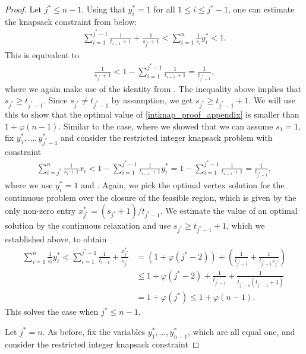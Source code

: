 \documentclass[pdflatex]{sn-jnl}
\theoremstyle{thmstyleone}%
\theoremstyle{thmstyletwo}%
\theoremstyle{thmstylethree}%
\begin{document}
\begin{proof}
		Let $j^* \leq n - 1$. 
		Using that $y_{i}^*= 1$ for all $1\leq i \leq j^*-1$, one can estimate the knapsack constraint from below:
		\begin{align*}
			\sum_{i=1}^{j^*-1}\frac{1}{t_{i-1} + 1} + \frac{1}{s_{j^*} + 1} < \sum_{i=1}^n \frac{1}{s_i}y^*_i < 1.
		\end{align*}
		This is equivalent to 
		\begin{align*}
			\frac{1}{s_{j^*} + 1} < 1 - \sum_{i=1}^{j^*-1} \frac{1}{t_{i-1} + 1} = \frac{1}{t_{j^*-1}},
		\end{align*}
		where we again make use of the identity from \cite{sylvestersequence1880sylvester}. The inequality above implies that $s_{j^*}\geq t_{j^*-1}$. Since $s_{j^*}\neq t_{j^*-1}$ by assumption, we get $s_{j^*}\geq t_{j^*-1} + 1$. We will use this to show that the optimal value of \eqref{intknap_proof_appendix} is smaller than $1+\varphi(n-1)$. Similar to the case, where we showed that we can assume $s_1 = 1$, fix $y_1^*,\ldots,y_{j^*-1}^*$ and consider the restricted integer knapsack problem with constraint
		\begin{align*}
			\sum_{i = j^*}^n \frac{1}{s_i + 1}x_i < 1 - \sum_{i=1}^{j^*-1} \frac{1}{t_{i-1} + 1}y^*_{i} =  1 - \sum_{i=1}^{j^*-1} \frac{1}{t_{i-1} + 1} = \frac{1}{t_{j^*-1}},
		\end{align*} 
		where we use $y^*_{i} = 1$ and \cite{sylvestersequence1880sylvester}. 
		Again, we pick the optimal vertex solution for the continuous problem over the closure of the feasible region, which is given by the only non-zero entry $x^*_{j^*} = (s_{j^*} + 1)/t_{j^*-1}$. We estimate the value of an optimal solution by the continuous relaxation and use $s_{j^*}\geq t_{j^*-1} + 1$, which we established above, to obtain
		\begin{align*}
			\sum_{i=1}^n \frac{1}{s_i}y^*_i < \sum_{i=1}^{j^*-1}\frac{1}{t_{i-1}} + \frac{x^*_{j^*}}{s_{j^*}} & = (1 + \varphi(j^* - 2)) + \left(\frac{1}{t_{j^*-1}} + \frac{1}{t_{j^*-1}s_{j^*}}\right) \\ 
			& \leq 1 + \varphi(j^* - 2) + \frac{1}{t_{j^*-1}} + \frac{1}{t_{j^*-1}(t_{j^*-1} + 1)} \\
			& = 1 + \varphi(j^*) \leq 1 + \varphi(n-1).
		\end{align*} 
		This solves the case when $j^* \leq n-1$.
		
		Let $j^* = n$. As before, fix the variables $y_1^*,\ldots,y_{n-1}^*$, which are all equal one, and consider the restricted integer knapsack constraint
		

\end{proof}
\end{document}
